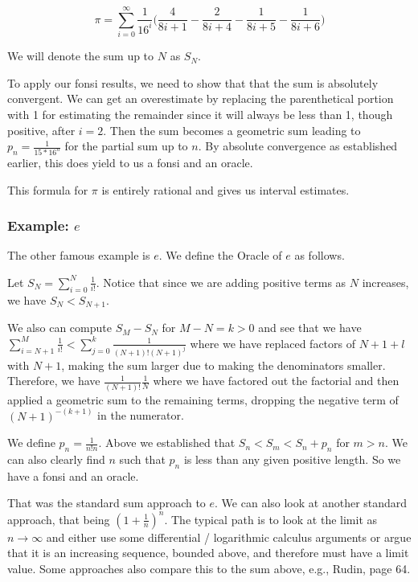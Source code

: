 \documentclass[12pt]{article}
\theoremstyle{remark}
\begin{document}
\[ 
\pi = \sum_{i=0}^\infty \frac{1}{16^i} \bigg( \frac{4}{8i+1} - \frac{2}{8i+4} - \frac{1}{8i+5} - \frac{1}{8i+6} \bigg)
\]

We will denote the sum up to $N$ as $S_N$.

To apply our fonsi results, we need to show that that the sum is absolutely convergent. We can get an overestimate by replacing the parenthetical portion with 1 for estimating the remainder since it will always be less than 1, though positive, after $i=2$. Then the sum becomes a geometric sum leading to $p_n = \frac{1}{15*16^n}$ for the partial sum up to $n$. By absolute convergence as established earlier, this does yield to us a fonsi and an oracle.  

This formula for $\pi$ is entirely rational and gives us interval estimates.

\subsubsection{Example: $e$}\label{sec:e}

The other famous example is $e$. We define the Oracle of $e$ as follows. 

Let $S_N = \sum_{i=0}^N \frac{1}{i!}$. Notice that since we are adding positive terms as $N$ increases, we have $S_N < S_{N+1}$. 

We also can compute $S_M - S_N$ for $M - N = k > 0$ and see that we have $\sum_{i=N+1}^M \frac{1}{i!} <  \sum_{j=0}^k  \frac{1}{(N+1)!(N+1)^j} $ where we have replaced factors of $N+1 + l$ with $N+1$, making the sum larger due to making the denominators smaller. Therefore, we have $\frac{1}{(N+1)!} \frac{1}{N}$ where we have factored out the factorial and then applied a geometric sum to the remaining terms, dropping the negative term of $(N+1)^{-(k+1)}$ in the numerator. 

We define $p_n = \frac{1}{n!n}$. Above we established that $S_n < S_m < S_n + p_n$ for $m> n$. We can also clearly find $n$ such that $p_n$ is less than any given positive length. So we have a fonsi and an oracle. 

That was the standard sum approach to $e$. We can also look at another standard approach, that being $(1+\frac{1}{n})^n$. The typical path is to look at the limit as $n\to \infty$ and either use some differential / logarithmic calculus arguments or argue that it is an increasing sequence, bounded above, and therefore must have a limit value. Some approaches also compare this to the sum above, e.g., Rudin\cite{rudin}, page 64. 
\end{document}
